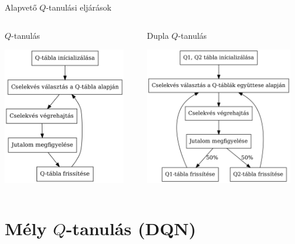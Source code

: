 \documentclass[english, aspectratio=169]{beamer}
\makeatletter
\let\origtableofcontents=\tableofcontents
\def\tableofcontents{\@ifnextchar[{\origtableofcontents}{\gobbletableofcontents}}
\def\gobbletableofcontents#1{\origtableofcontents}
\makeatother
\begin{document}
\begin{frame}{Alapvető $Q$-tanulási eljárások}
\begin{columns}
\begin{column}{.5\textwidth}
\begin{center}
$Q$-tanulás\par\smallskip
\includegraphics[height=6cm, keepaspectratio]{../../5_ql/doc/graphs/ql_1.png}
\end{center}
\end{column}
\begin{column}{.5\textwidth}
\begin{center}
Dupla $Q$-tanulás\par\smallskip
\includegraphics[height=6cm, keepaspectratio]{../../5_ql/doc/graphs/ql_2.png}
\end{center}
\end{column}
\end{columns}
\end{frame}

\section{Mély $Q$-tanulás (DQN)}

\begin{frame}
\tableofcontents[currentsection]
\end{frame}
\end{document}
